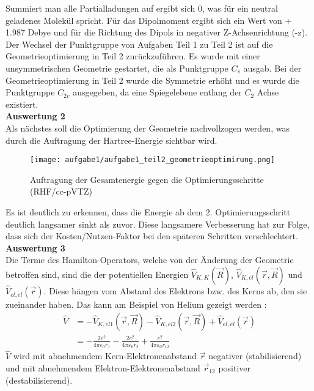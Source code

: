 \documentclass[12pt]{article}
\begin{document}
\begin{onehalfspace}
\begin{table}[htbp]
\begin{tabular}{lr}
\end{tabular}
\end{table}
\noindent
Summiert man alle Partialladungen auf ergibt sich 0, was für ein neutral geladenes Molekül spricht.
Für das Dipolmoment ergibt sich ein Wert von + 1.987 Debye und für die Richtung des Dipols in negativer Z-Achsenrichtung (-z).
Der Wechsel der Punktgruppe von Aufgaben Teil 1 zu Teil 2 ist auf die Geometrieoptimierung in Teil 2 zurückzuführen. Es wurde mit einer unsymmetrischen Geometrie gestartet, die als Punktgruppe $C _s$ ausgab. Bei der Geometrieoptimierung in Teil 2 wurde die Symmetrie erhöht und es wurde die Punktgruppe $C _{2v}$ ausgegeben, da eine Spiegelebene entlang der $C _2$ Achse existiert.\\
\noindent
\textbf{Auswertung 2}\\
Als nächstes soll die Optimierung der Geometrie nachvollzogen werden, was durch die Auftragung der Hartree-Energie sichtbar wird.
\begin{figure}[!htp]
\centering
  \texttt{[image: aufgabe1/aufgabe1\_teil2\_geometrieoptimirung.png]}%
  \caption{Auftragung der Gesamtenergie gegen die Optimierungsschritte (RHF/cc-pVTZ)}
\end{figure}
Es ist deutlich zu erkennen, dass die Energie ab dem 2. Optimierungsschritt deutlich langsamer sinkt als zuvor. Diese langsamere Verbesserung hat zur Folge, dass sich der Kosten/Nutzen-Faktor bei den späteren Schritten verschlechtert.\\
\newpage
\noindent
\textbf{Auswertung 3}\\
Die Terme des Hamilton-Operators, welche von der Änderung der Geometrie betroffen sind, sind die der potentiellen Energien 
$\hat{V} _{K,K}(\vec{R})$, $\hat{V} _{K,el}(\vec{r},\vec{R})$ und $\hat{V} _{el,el}(\vec{r})$.
Diese hängen vom Abstand des Elektrons bzw. des Kerns ab, den sie zueinander haben. Das kann am Beispiel von Helium gezeigt werden \cite{atkins219}:\\
\begin{align*}
\hat{V} &= - \hat{V} _{K,el1}(\vec{r},\vec{R}) - \hat{V} _{K,el2}(\vec{r},\vec{R})  + \hat{V} _{el,el}(\vec{r}) \\
  &= - \frac{2e^2}{4\pi \varepsilon _0 r _1} - \frac{2e^2}{4\pi \varepsilon _0 r _2} +  \frac{e^2}{4\pi \varepsilon _0 r _{12}}
\end{align*}
$\hat{V}$ wird mit abnehmendem Kern-Elektronenabstand $\vec{r}$ negativer (stabilisierend) und mit abnehmendem Elektron-Elektronenabstand $\vec{r} _{12}$ positiver (destabilisierend).


\end{onehalfspace}
\end{document}
